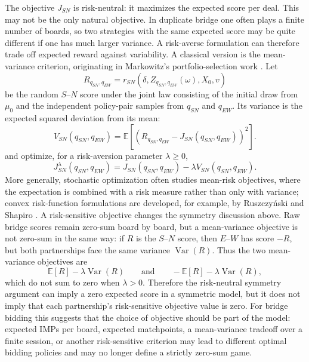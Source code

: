 \documentclass[11pt]{article}
\begin{document}
The objective $J_{SN}$ is risk-neutral: it maximizes the expected score per deal. This may not be the only natural objective. In duplicate bridge one often plays a finite number of boards, so two strategies with the same expected score may be quite different if one has much larger variance. A risk-averse formulation can therefore trade off expected reward against variability. A classical version is the mean-variance criterion, originating in Markowitz's portfolio-selection work \cite{markowitz1952portfolio}. Let
\[
    R_{q_{SN},q_{EW}}
    =
    r_{SN}(\delta,Z_{q_{SN},q_{EW}}(\omega),X_0,v)
\]
be the random $S$--$N$ score under the joint law consisting of the initial draw from $\mu_0$ and the independent policy-pair samples from $q_{SN}$ and $q_{EW}$. Its variance is the expected squared deviation from its mean:
\[
    V_{SN}(q_{SN},q_{EW})
    =
    \mathbb{E}\left[
        \left(
            R_{q_{SN},q_{EW}}
            -J_{SN}(q_{SN},q_{EW})
        \right)^2
    \right].
\]
and optimize, for a risk-aversion parameter $\lambda\geq 0$,
\[
    J_{SN}^{\lambda}(q_{SN},q_{EW})
    =
    J_{SN}(q_{SN},q_{EW})
    -\lambda V_{SN}(q_{SN},q_{EW}).
\]
More generally, stochastic optimization often studies mean-risk objectives, where the expectation is combined with a risk measure rather than only with variance; convex risk-function formulations are developed, for example, by Ruszczy{\'n}ski and Shapiro \cite{ruszczynski2006convexrisk}. A risk-sensitive objective changes the symmetry discussion above. Raw bridge scores remain zero-sum board by board, but a mean-variance objective is not zero-sum in the same way: if $R$ is the $S$--$N$ score, then $E$--$W$ has score $-R$, but both partnerships face the same variance $\operatorname{Var}(R)$. Thus the two mean-variance objectives are
\[
    \mathbb{E}[R]-\lambda\operatorname{Var}(R)
    \qquad\text{and}\qquad
    -\mathbb{E}[R]-\lambda\operatorname{Var}(R),
\]
which do not sum to zero when $\lambda>0$. Therefore the risk-neutral symmetry argument can imply a zero expected score in a symmetric model, but it does not imply that each partnership's risk-sensitive objective value is zero. For bridge bidding this suggests that the choice of objective should be part of the model: expected IMPs per board, expected matchpoints, a mean-variance tradeoff over a finite session, or another risk-sensitive criterion may lead to different optimal bidding policies and may no longer define a strictly zero-sum game.
\end{document}
